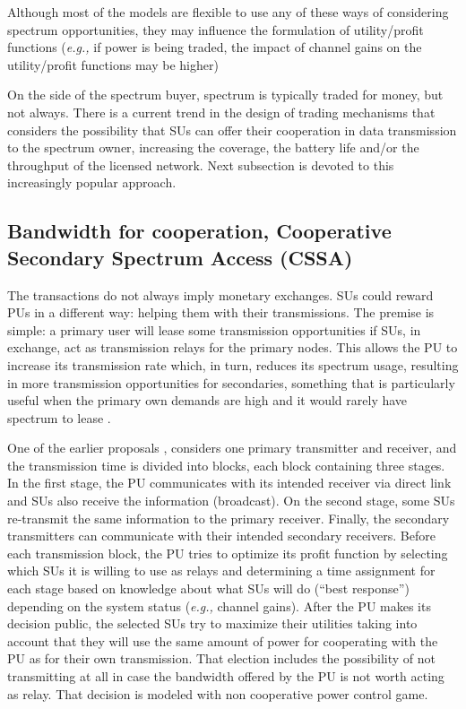 Although most of the models are flexible to use any of these ways of considering spectrum opportunities, they may influence the formulation of utility/profit functions (\textit{e.g.,} if power is being traded, the impact of channel gains on the utility/profit functions may be higher)

On the side of the spectrum buyer, spectrum is typically traded for money, but not always. There is a current trend in the design of trading mechanisms that considers the possibility that SUs can offer their cooperation in data transmission to the spectrum owner, increasing the coverage, the battery life and/or the throughput of the licensed network. Next subsection is devoted to this increasingly popular approach. 

\subsection{Bandwidth for cooperation, Cooperative Secondary Spectrum Access (CSSA)}
\label{subsec:Band}
The transactions do not always imply monetary exchanges. SUs could reward PUs in a different way: helping them with their transmissions. The premise is simple: a primary user will lease some transmission opportunities if SUs, in exchange, act as transmission relays for the primary nodes. This allows the PU to increase its transmission rate which, in turn, reduces its spectrum usage, resulting in more transmission opportunities for secondaries, something that is particularly useful when the primary own demands are high and it would rarely have spectrum to lease \cite{ref:Simeone2008,ref:Zhang2009,ref:Yi2010,ref:Vazquez2010,ref:Li2011,ref:Duan2011_Contract}.

One of the earlier proposals \cite{ref:Simeone2008}, considers one primary transmitter and receiver, and the transmission time is divided into blocks, each block containing three stages. In the first stage, the PU communicates with its intended receiver via direct link and SUs also receive the information (broadcast). On the second stage, some SUs re-transmit the same information to the primary receiver. Finally, the secondary transmitters can communicate with their intended secondary receivers. Before each transmission block, the PU tries to optimize its profit function by selecting which SUs it is willing to use as relays and determining a time assignment for each stage based on knowledge about what SUs will do (``best response'') depending on the system status (\textit{e.g.,} channel gains). After the PU makes its decision public, the selected SUs try to maximize their utilities taking into account that they will use the same amount of power for cooperating with the PU as for their own transmission. That election includes the possibility of not transmitting at all in case the bandwidth offered by the PU is not worth acting as relay. That decision is modeled with non cooperative power control game.

